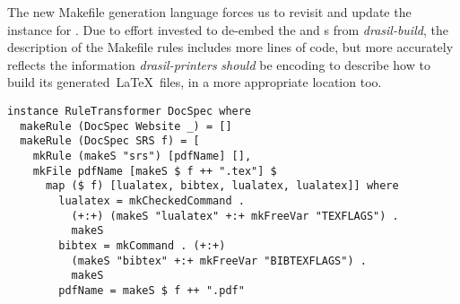 {{{{{%

% 


The new Makefile generation language forces us to revisit and update the  instance for . Due to effort invested to de-embed the  and  s from \textit{drasil-build}, the description of the Makefile rules includes more lines of code, but more accurately reflects the information \textit{drasil-printers} \textit{should} be encoding to describe how to build its generated\ \LaTeX\ files, in a more appropriate location too.

\begin{tcolorbox}
\begin{verbatim}
instance RuleTransformer DocSpec where
  makeRule (DocSpec Website _) = []
  makeRule (DocSpec SRS f) = [
    mkRule (makeS "srs") [pdfName] [],
    mkFile pdfName [makeS $ f ++ ".tex"] $
      map ($ f) [lualatex, bibtex, lualatex, lualatex]] where
        lualatex = mkCheckedCommand .
          (+:+) (makeS "lualatex" +:+ mkFreeVar "TEXFLAGS") .
          makeS
        bibtex = mkCommand . (+:+)
          (makeS "bibtex" +:+ mkFreeVar "BIBTEXFLAGS") .
          makeS
        pdfName = makeS $ f ++ ".pdf"
\end{verbatim}
\end{tcolorbox}

}}}}}
